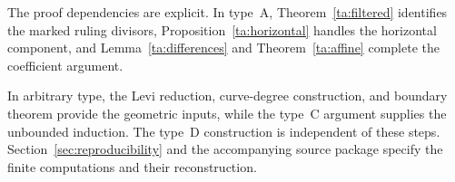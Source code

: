 The proof dependencies are explicit. In type~A, Theorem~\ref{ta:filtered} identifies the marked ruling divisors, Proposition~\ref{ta:horizontal} handles the horizontal component, and Lemma~\ref{ta:differences} and Theorem~\ref{ta:affine} complete the coefficient argument.

In arbitrary type, the Levi reduction, curve-degree construction, and boundary theorem provide the geometric inputs, while the type~C argument supplies the unbounded induction. The type~D construction is independent of these steps. Section~\ref{sec:reproducibility} and the accompanying source package specify the finite computations and their reconstruction.
